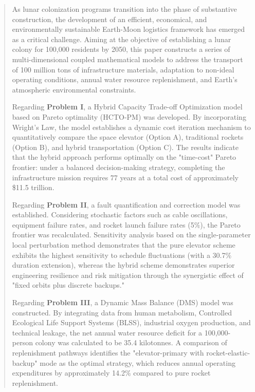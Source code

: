 \begin{abstract}
\setlength{\parindent}{2em}
\indent As lunar colonization programs transition into the phase of substantive construction, the development of an efficient, economical, and environmentally sustainable Earth-Moon logistics framework has emerged as a critical challenge. Aiming at the objective of establishing a lunar colony for 100,000 residents by 2050, this paper constructs a series of multi-dimensional coupled mathematical models to address the transport of 100 million tons of infrastructure materials, adaptation to non-ideal operating conditions, annual water resource replenishment, and Earth’s atmospheric environmental constraints.

\indent Regarding \textbf{Problem I}, a Hybrid Capacity Trade-off Optimization model based on Pareto optimality (HCTO-PM) was developed. By incorporating Wright's Law, the model establishes a dynamic cost iteration mechanism to quantitatively compare the space elevator (Option A), traditional rockets (Option B), and hybrid transportation (Option C). The results indicate that the hybrid approach performs optimally on the "time-cost" Pareto frontier: under a balanced decision-making strategy, completing the infrastructure mission requires 77 years at a total cost of approximately \$11.5 trillion.

\indent Regarding \textbf{Problem II}, a fault quantification and correction model was established. Considering stochastic factors such as cable oscillations, equipment failure rates, and rocket launch failure rates (5\%), the Pareto frontier was recalculated. Sensitivity analysis based on the single-parameter local perturbation method demonstrates that the pure elevator scheme exhibits the highest sensitivity to schedule fluctuations (with a 30.7\% duration extension), whereas the hybrid scheme demonstrates superior engineering resilience and risk mitigation through the synergistic effect of "fixed orbits plus discrete backups."

\indent Regarding \textbf{Problem III}, a Dynamic Mass Balance (DMS) model was constructed. By integrating data from human metabolism, Controlled Ecological Life Support Systems (BLSS), industrial oxygen production, and technical leakage, the net annual water resource deficit for a 100,000-person colony was calculated to be 35.4 kilotonnes. A comparison of replenishment pathways identifies the "elevator-primary with rocket-elastic-backup" mode as the optimal strategy, which reduces annual operating expenditures by approximately 14.2\% compared to pure rocket replenishment.


\end{abstract}
